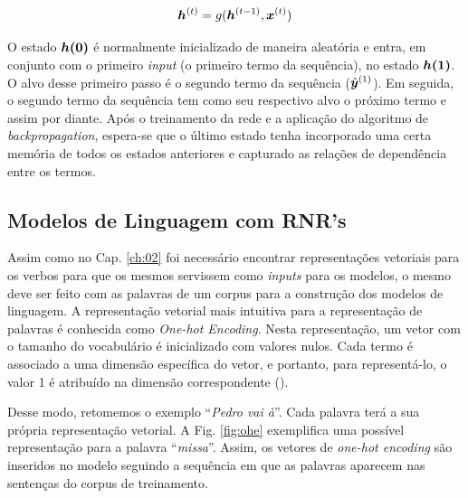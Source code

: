 \begin{equation}
\bm{h}^{(t)} = g(\bm{h}^{(t-1)}, \bm{x}^{(t)})
\label{eq:rnn}
\end{equation}


O estado $\bm{h(0)}$ é normalmente inicializado de maneira aleatória e entra, em conjunto com o primeiro \textit{input} (o primeiro termo da sequência), no estado $\bm{h(1)}$. O alvo desse primeiro passo é o segundo termo da sequência ($\hat{\bm{y}}^{(1)}$). Em seguida, o segundo termo da sequência tem como seu respectivo alvo o próximo termo e assim por diante. Após o treinamento da rede e a aplicação do algoritmo de \textit{backpropagation}, espera-se que o último estado tenha incorporado uma certa memória de todos os estados anteriores e capturado as relações de dependência entre os termos.%

\subsection{Modelos de Linguagem com RNR's}

Assim como no Cap. \ref{ch:02} foi necessário encontrar representações vetoriais para os verbos para que os mesmos servissem como \textit{inputs} para os modelos, o mesmo deve ser feito com as palavras de um corpus para a construção dos modelos de linguagem. A representação vetorial mais intuitiva para a representação de palavras é conhecida como \textit{One-hot Encoding}. Nesta representação, um vetor com o tamanho do vocabulário é inicializado com valores nulos. Cada termo é associado a uma dimensão específica do vetor, e portanto, para representá-lo, o valor 1 é atribuído na dimensão correspondente (\cite{harris:2013}). 

Desse modo, retomemos o exemplo “\textit{Pedro vai à}”. Cada palavra terá a sua própria representação vetorial. A Fig. \ref{fig:ohe} exemplifica uma possível representação para a palavra “\textit{missa}”. Assim, os vetores de \textit{one-hot encoding} são inseridos no modelo seguindo a sequência em que as palavras aparecem nas sentenças do corpus de treinamento. 




